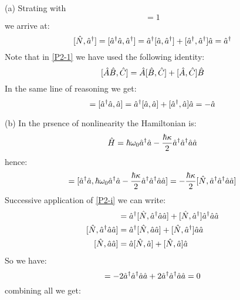 \begin{homeworkProblem}
\begin{homeworkSection}{(a)}
Strating with
\begin{equation*}
[\A{a},\A{a}^\dagger]=1
\end{equation*}
we arrive at:
\begin{equation}\label{P2-1}
[\Hat{N},\Hat{a}^\dagger]=[\Hat{a}^\dagger\Hat{a},\Hat{a}^\dagger]=\Hat{a}^\dagger[\Hat{a},\Hat{a}^\dagger]+[\Hat{a}^\dagger,\Hat{a}^\dagger]\Hat{a}=\Hat{a}^\dagger
\end{equation}
Note that in \eqref{P2-1} we have used the following identity:
\begin{equation}\label{P2-i}
[\Hat{A}\Hat{B},\Hat{C}]=\Hat{A}[\Hat{B},\Hat{C}]+[\Hat{A},\Hat{C}]\Hat{B}
\end{equation}
In the same line of reasoning we get:
\begin{equation}
[\A{N},\A{a}]=[\A{a}^\dagger\A{a},\A{a}]=\A{a}^\dagger[\A{a},\A{a}]+[\A{a}^\dagger,\A{a}]\A{a}=-\A{a}
\end{equation}
\end{homeworkSection}
\begin{homeworkSection}{(b)}
In the prsence of nonlinearity the Hamiltonian is:
\begin{equation}
\Hat{H}=\hbar\omega_0\Hat{a}^\dagger\Hat{a}-\frac{\hbar\kappa}{2}\Hat{a}^\dagger\Hat{a}^\dagger\Hat{a}\Hat{a}
\end{equation}
hence:
\begin{equation}
[\A{N},\A{H}]=[\A{a}^\dagger\A{a},\hbar\omega_0\A{a}^\dagger\A{a}-\frac{\hbar\kappa}{2}\A{a}^\dagger\A{a}^\dagger\A{a}\A{a}]=
-\frac{\hbar\kappa}{2}[\A{N},\A{a}^\dagger\A{a}^\dagger\A{a}\A{a}]
\end{equation}
Successive application of \eqref{P2-i} we can write:
\begin{align}
[\A{N},\A{a}^\dagger\A{a}^\dagger\A{a}\A{a}] &=\A{a}^\dagger [\A{N},\A{a}^\dagger\A{a}\A{a}]+[\A{N},\A{a}^\dagger]\A{a}^\dagger\A{a}\A{a}\\
[\A{N},\A{a}^\dagger\A{a}\A{a}]  &=  \A{a}^\dagger[\A{N},\A{a}\A{a}]+[\A{N},\A{a}^\dagger]\A{a}\A{a}\\
[\A{N},\A{a}\A{a}] &=\A{a}[\A{N},\A{a}]+[\A{N},\A{a}]\A{a}
\end{align} 
So we have:
\begin{equation}
[\A{N},\A{a}^\dagger\A{a}^\dagger\A{a}\A{a}]=-2\A{a}^\dagger\A{a}^\dagger\A{a}\A{a}+2\A{a}^\dagger\A{a}^\dagger\A{a}\A{a}=0
\end{equation}
combining all we get:
\begin{equation}\label{P2-NH}

\end{equation}
\end{homeworkSection}
\end{homeworkProblem}
